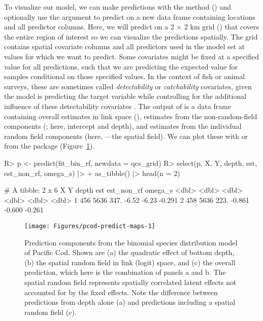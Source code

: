 \documentclass[article]{jss}\usepackage[]{graphicx}\usepackage[dvipsnames]{xcolor}
\newcommand{\fct}[1]{\code{#1()}}
\begin{document}
\sloppy To visualize our model, we can make predictions with the \fct{predict} method () and optionally use the  argument to predict on a new data frame containing locations and all predictor columns.
Here, we will predict on a 2 \(\times\) 2 km grid () that covers the entire region of interest so we can visualize the predictions spatially.
The grid contains spatial covariate columns and all predictors used in the model set at values for which we want to predict.
Some covariates might be fixed at a specified value for all predictions, such that we are predicting the expected value for samples conditional on those specified values.
In the context of fish or animal surveys, these are sometimes called \emph{detectability} or \emph{catchability} covariates, given the model is predicting the target variable while controlling for the additional influence of these detectability covariates \cite{thorson2019}.
The output of \fct{predict} is a data frame containing overall estimates in link space (), estimates from the non-random-field components (; here, intercept and depth), and estimates from the individual random field components (here, ---the spatial field).
We can plot these with \fct{geom\_raster} or \fct{geom\_tile}  from the  \citep{ggplot2} package (Figure~\ref{fig:pcod-predict-maps}).

\begin{Schunk}
\begin{Sinput}
R> p <- predict(fit_bin_rf, newdata = qcs_grid)
R> select(p, X, Y, depth, est, est_non_rf, omega_s) |>
+    as_tibble() |> head(n = 2)
\end{Sinput}
\begin{Soutput}
# A tibble: 2 x 6
      X     Y depth    est est_non_rf omega_s
  <dbl> <dbl> <dbl>  <dbl>      <dbl>   <dbl>
1   456  5636  347. -6.52      -6.23   -0.291
2   458  5636  223. -0.861     -0.600  -0.261
\end{Soutput}
\end{Schunk}

\begin{Schunk}
\begin{figure}[ht]

{\centering \texttt{[image: Figures/pcod-predict-maps-1]}

}

\caption[Prediction components from the binomial species distribution model of Pacific Cod]{Prediction components from the binomial species distribution model of Pacific Cod. Shown are (a) the quadratic effect of bottom depth, (b) the spatial random field in link (logit) space, and (c) the overall prediction, which here is the combination of panels a and b. The spatial random field represents spatially correlated latent effects not accounted for by the fixed effects. Note the difference between predictions from depth alone (a) and predictions including a spatial random field (c).}\label{fig:pcod-predict-maps}
\end{figure}
\end{Schunk}
\end{document}

